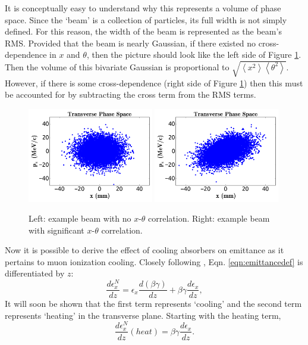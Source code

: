 It is conceptually easy to understand why this represents a volume of phase space. Since the `beam' is a collection of particles, its full width is not simply defined. For this reason, the width of the beam is represented as the beam's RMS. Provided that the beam is nearly Gaussian, if there existed no cross-dependence in $x$ and $\theta$, then the picture should look like the left side of Figure \ref{fig:ellipses}. Then the volume of this bivariate Gaussian is proportional to $\sqrt{\left<x^2\right>\left<\theta^2\right>}$. However, if there is some cross-dependence (right side of Figure \ref{fig:ellipses}) then this must be accounted for by subtracting the cross term from the RMS terms.

\begin{figure}
  \begin{center}
    \includegraphics[width=0.49\textwidth]{Figures/ellipse0} 
    \includegraphics[width=0.49\textwidth]{Figures/ellipse1} 
  \caption{Left: example beam with no $x$-$\theta$ correlation. Right: example beam with significant $x$-$\theta$ correlation.}
  \label{fig:ellipses}
 \end{center}
\end{figure}

Now it is possible to derive the effect of cooling absorbers on emittance as it pertains to muon ionization cooling. Closely following \cite{Fernow}, Eqn. \ref{eqn:emittancedef} is differentiated by $z$:
%
\begin{equation}
\label{eqn:emittance1}
\frac{d\epsilon_x^N}{dz}=\epsilon_x \frac{d(\beta\gamma)}{dz}+\beta\gamma\frac{d\epsilon_x}{dz},
\end{equation}
%
It will soon be shown that the first term represents `cooling' and the second term represents `heating' in the transverse plane. Starting with the heating term,
%
\begin{equation} \nonumber
\frac{d\epsilon_x^N}{dz}(heat)=\beta\gamma\frac{d\epsilon_x}{dz}.
\end{equation}
%

